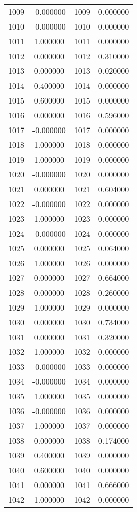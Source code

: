 \documentclass[12pt]{article}
\begin{document}
\begin{longtable}{@{}cccc@{}}
1009 & -0.000000 & 1009 & 0.000000 \\
1010 & -0.000000 & 1010 & 0.000000 \\
1011 & 1.000000 & 1011 & 0.000000 \\
1012 & 0.000000 & 1012 & 0.310000 \\
1013 & 0.000000 & 1013 & 0.020000 \\
1014 & 0.400000 & 1014 & 0.000000 \\
1015 & 0.600000 & 1015 & 0.000000 \\
1016 & 0.000000 & 1016 & 0.596000 \\
1017 & -0.000000 & 1017 & 0.000000 \\
1018 & 1.000000 & 1018 & 0.000000 \\
1019 & 1.000000 & 1019 & 0.000000 \\
1020 & -0.000000 & 1020 & 0.000000 \\
1021 & 0.000000 & 1021 & 0.604000 \\
1022 & -0.000000 & 1022 & 0.000000 \\
1023 & 1.000000 & 1023 & 0.000000 \\
1024 & -0.000000 & 1024 & 0.000000 \\
1025 & 0.000000 & 1025 & 0.064000 \\
1026 & 1.000000 & 1026 & 0.000000 \\
1027 & 0.000000 & 1027 & 0.664000 \\
1028 & 0.000000 & 1028 & 0.260000 \\
1029 & 1.000000 & 1029 & 0.000000 \\
1030 & 0.000000 & 1030 & 0.734000 \\
1031 & 0.000000 & 1031 & 0.320000 \\
1032 & 1.000000 & 1032 & 0.000000 \\
1033 & -0.000000 & 1033 & 0.000000 \\
1034 & -0.000000 & 1034 & 0.000000 \\
1035 & 1.000000 & 1035 & 0.000000 \\
1036 & -0.000000 & 1036 & 0.000000 \\
1037 & 1.000000 & 1037 & 0.000000 \\
1038 & 0.000000 & 1038 & 0.174000 \\
1039 & 0.400000 & 1039 & 0.000000 \\
1040 & 0.600000 & 1040 & 0.000000 \\
1041 & 0.000000 & 1041 & 0.666000 \\
1042 & 1.000000 & 1042 & 0.000000 \\

\end{longtable}
\end{document}
